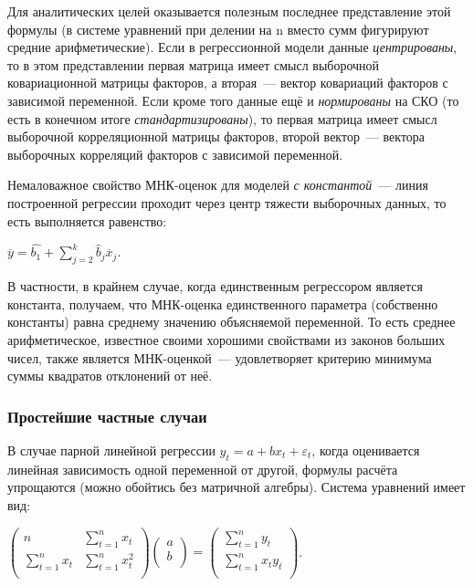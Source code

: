 \documentclass[a4paper]{article}
\begin{document}
{{{{{{{{Для аналитических целей оказывается полезным последнее представление
этой формулы (в системе уравнений при делении на n вместо сумм
фигурируют средние арифметические). Если в регрессионной модели данные
\emph{центрированы}, то в этом представлении первая матрица имеет смысл
выборочной ковариационной матрицы факторов, а вторая~--- вектор
ковариаций факторов с зависимой переменной. Если кроме того данные ещё и
\emph{нормированы} на СКО (то есть в конечном итоге
\emph{стандартизированы}), то первая матрица имеет смысл выборочной
корреляционной матрицы факторов, второй вектор~--- вектора выборочных
корреляций факторов с зависимой переменной.

Немаловажное свойство МНК-оценок для моделей \emph{с константой}~---
линия построенной регрессии проходит через центр тяжести выборочных
данных, то есть выполняется равенство:

\begin{center}
 {{\(\overline{y} = \hat{b_{1}} + \sum\limits_{j = 2}^{k}{\hat{b}}_{j}{\overline{x}}_{j}\)}}.
\end{center}

В частности, в крайнем случае, когда единственным регрессором является
константа, получаем, что МНК-оценка единственного параметра (собственно
константы) равна среднему значению объясняемой переменной. То есть
среднее арифметическое, известное своими хорошими свойствами из законов
больших чисел, также является МНК-оценкой~--- удовлетворяет критерию
минимума суммы квадратов отклонений от неё.

\subsubsection{Простейшие частные случаи}

В случае парной линейной регрессии
{{\(y_{t} = a + bx_{t} + \varepsilon_{t}\)}}, когда оценивается линейная
зависимость одной переменной от другой, формулы расчёта упрощаются
(можно обойтись без матричной алгебры). Система уравнений имеет вид:

\begin{center}
    {{\(\begin{pmatrix}
    n & {\sum\limits_{t = 1}^{n}x_{t}} \\
    {\sum\limits_{t = 1}^{n}x_{t}} & {\sum\limits_{t = 1}^{n}x_{t}^{2}} \\
    \end{pmatrix}\begin{pmatrix}
    a \\
    b \\
    \end{pmatrix} = \begin{pmatrix}
    {\sum\limits_{t = 1}^{n}y_{t}} \\
    {\sum\limits_{t = 1}^{n}x_{t}y_{t}} \\
    \end{pmatrix}\)}}.
\end{center}


}}}}}}}}
\end{document}
